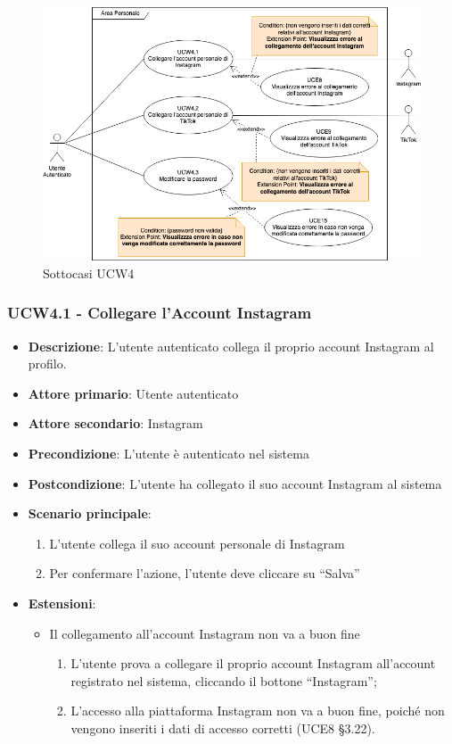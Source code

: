 \begin{figure}[!h]
\centering
\includegraphics[scale=0.5]{UC_images/UCW4-1.png}
\caption{Sottocasi UCW4}
\end{figure}
\subsubsection{UCW4.1 - Collegare l'Account Instagram}
\begin{itemize}
\item \textbf{Descrizione}: L'utente autenticato collega il proprio account Instagram al profilo.
\item \textbf{Attore primario}: Utente autenticato
\item \textbf{Attore secondario}: Instagram
\item \textbf{Precondizione}: L’utente è autenticato nel sistema
\item \textbf{Postcondizione}: L’utente ha collegato il suo account Instagram al sistema

\item \textbf{Scenario principale}:
\begin{enumerate}
\item L’utente collega il suo account personale di Instagram
\item Per confermare l’azione, l’utente deve cliccare su “Salva” 
\end{enumerate}

\item \textbf{Estensioni}:
\begin{itemize}
\item Il collegamento all’account Instagram non va a buon fine
\begin{enumerate}
	\item L’utente prova a collegare il proprio account Instagram all’account registrato nel sistema, cliccando il bottone “Instagram”;
	\item L’accesso alla piattaforma Instagram non va a buon fine, poiché non vengono inseriti i dati di accesso corretti (UCE8 §3.22).
\end{enumerate}
\end{itemize}
\end{itemize}

